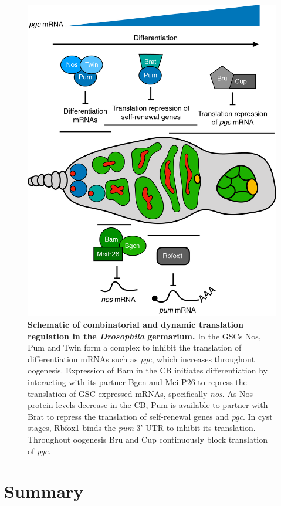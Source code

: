 \documentclass[12pt,oneside]{reedthesis}
\begin{document}
\begin{figure}

{\centering \includegraphics[width=0.82\linewidth]{./figure/Book Chapter/Figure4} 

}

\caption[\textbf{Schematic of combinatorial and dynamic translation regulation in the \emph{Drosophila} germarium.}]{\textbf{Schematic of combinatorial and dynamic translation regulation in the \emph{Drosophila} germarium.} In the GSCs Nos, Pum and Twin form a complex to inhibit the translation of differentiation mRNAs such as \emph{pgc}, which increases throughout oogenesis. Expression of Bam in the CB initiates differentiation by interacting with its partner Bgcn and Mei-P26 to repress the translation of GSC-expressed mRNAs, specifically \emph{nos}. As Nos protein levels decrease in the CB, Pum is available to partner with Brat to repress the translation of self-renewal genes and \emph{pgc}. In cyst stages, Rbfox1 binds the \emph{pum} 3' UTR to inhibit its translation. Throughout oogenesis Bru and Cup continuously block translation of \emph{pgc}.}\label{fig:unnamed-chunk-7}
\end{figure}
\hypertarget{summary}{%
\section{Summary}\label{summary}}
\end{document}
